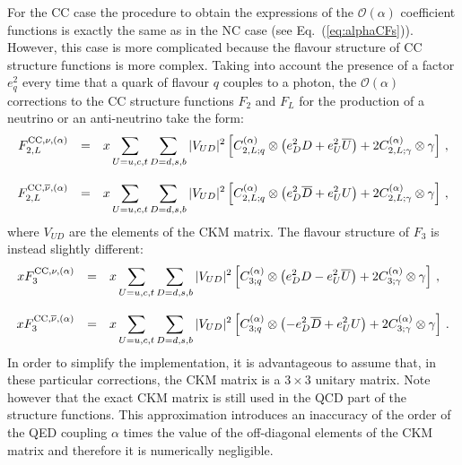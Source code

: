 For the CC case the procedure to obtain the
expressions of the $\mathcal{O}(\alpha)$ coefficient functions is
exactly the same as in the NC case (see
Eq.~(\ref{eq:alphaCFs})).
%
However, this case is more complicated
because the flavour structure of CC structure functions is more
complex.
%
Taking into account the presence of a factor $e_q^2$ every time that a
quark of flavour $q$ couples to a photon, the $\mathcal{O}(\alpha)$
corrections to the CC structure functions $F_2$ and $F_L$ for the
production of a neutrino or an anti-neutrino take the form:
\begin{equation}\label{compactNu}
\begin{array}{rcl}
F_{2,L}^{{\rm CC},\nu,(\alpha)} &=& \displaystyle
                              x\sum_{U=u,c,t}\sum_{D=d,s,b}|V_{UD}|^2\left[C_{2,L;q}^{(\alpha)}\otimes\left(e_D^2D +e_U^2\overline{U}\right) +2 C_{2,L;\gamma}^{(\alpha)}\otimes\gamma\right]\,,\\
\\
F_{2,L}^{{\rm CC},\overline{\nu},(\alpha)} &=& \displaystyle
x\sum_{U=u,c,t}\sum_{D=d,s,b}|V_{UD}|^2\left[C_{2,L;q}^{(\alpha)}\otimes\left(e_D^2\overline{D}
    +e_U^2U\right) +2 C_{2,L;\gamma}^{(\alpha)}\otimes\gamma\right]\,,
\end{array}
\end{equation}
where $V_{UD}$ are the elements of the CKM matrix.
%
The flavour structure of $F_3$ is instead slightly different:
\begin{equation}\label{compactNuF3}
\begin{array}{rcl}
xF_3^{{\rm CC},\nu,(\alpha)} &=& \displaystyle
                              x\sum_{U=u,c,t}\sum_{D=d,s,b}|V_{UD}|^2\left[C_{3;q}^{(\alpha)}\otimes\left(e_D^2D -e_U^2\overline{U}\right) +2 C_{3;\gamma}^{(\alpha)}\otimes\gamma\right]\,,\\
\\
xF_3^{{\rm CC},\overline{\nu},(\alpha)} &=& \displaystyle
x\sum_{U=u,c,t}\sum_{D=d,s,b}|V_{UD}|^2\left[C_{3;q}^{(\alpha)}\otimes\left(-e_D^2\overline{D}
    +e_U^2U\right) +2 C_{3;\gamma}^{(\alpha)}\otimes\gamma\right]\,.
\end{array}
\end{equation}
In order to simplify the implementation, it is advantageous to assume
that, in these particular corrections, the CKM matrix is a $3 \times 3$
unitary matrix. Note however that the exact CKM matrix is still used
in the QCD part of the structure functions.
%
This approximation introduces an inaccuracy of the order of the QED
coupling $\alpha$ times the value of the off-diagonal elements of the
CKM matrix and therefore it is numerically negligible.

